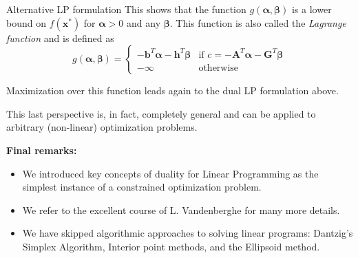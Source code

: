 \documentclass[11pt,compress,t,notes=noshow, xcolor=table]{beamer}
\begin{document}
\begin{vbframe}{Alternative LP formulation}
This shows that the function $g(\bm{\alpha},\bm{\beta})$ is a lower bound on $f(\bm{x}^*)$  
for $\bm{\alpha}>0$ and any $\bm{\beta}$. This function is also called the \emph{Lagrange function} and is defined as
$$\displaystyle g(\bm{\alpha},\bm{\beta}) =
\begin{cases} 
-\bm{b}^T\bm{\alpha} -\bm{h}^T\bm{\beta} & \text{if $c=-\bm{A}^T \bm{\alpha} - \bm{G}^T \bm{\beta}$} \\
-\infty & \text{otherwise}
\end{cases}$$

Maximization over this function leads again to the dual LP formulation above.

This last perspective is, in fact, completely general and can be applied to arbitrary
(non-linear) optimization problems. 

\vspace{1cm}

\textbf{Final remarks:}
\begin{itemize}
    \item We introduced key concepts of duality for Linear Programming as the simplest instance 
    of a constrained optimization problem.
    \item We refer to the excellent course of L. Vandenberghe  
    \href{http://www.seas.ucla.edu/~vandenbe/ee236a/ee236a.html}{} for many more details.
    \item We have skipped algorithmic approaches to solving linear programs: Dantzig's Simplex Algorithm, Interior point methods, and the Ellipsoid method.
\end{itemize}

\end{vbframe}

\endlecture
\end{document}
